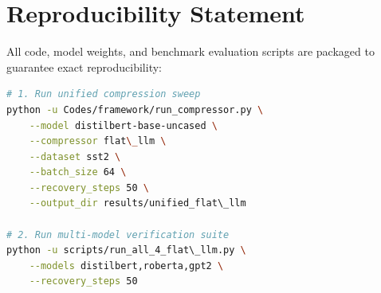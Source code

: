\section{Reproducibility Statement}
All code, model weights, and benchmark evaluation scripts are packaged to guarantee exact reproducibility:
\begin{lstlisting}[language=bash]
# 1. Run unified compression sweep
python -u Codes/framework/run_compressor.py \
    --model distilbert-base-uncased \
    --compressor flat\_llm \
    --dataset sst2 \
    --batch_size 64 \
    --recovery_steps 50 \
    --output_dir results/unified_flat\_llm

# 2. Run multi-model verification suite
python -u scripts/run_all_4_flat\_llm.py \
    --models distilbert,roberta,gpt2 \
    --recovery_steps 50
\end{lstlisting}
